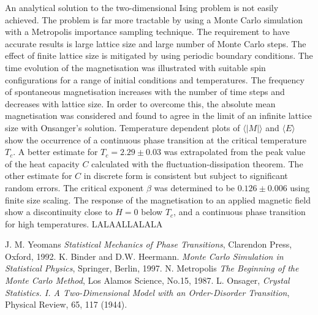 \documentclass[a4paper]{article}
\begin{document}
An analytical solution to the two-dimensional Ising problem is not easily achieved. The problem is far more tractable by using a Monte Carlo simulation with a Metropolis importance sampling technique. The requirement to have accurate results is large lattice size and large number of Monte Carlo steps. The effect of finite lattice size is mitigated by using periodic boundary conditions. The time evolution of the magnetisation was illustrated with suitable spin configurations for a range of initial conditions and temperatures. The frequency of spontaneous magnetisation increases with the number of time steps and decreases with lattice size. In order to overcome this, the absolute mean magnetisation was considered and found to agree in the limit of an infinite lattice size with Onsanger's solution. Temperature dependent plots of $\langle |M| \rangle$ and $\langle E \rangle$ show the occurrence of a continuous phase transition at the critical temperature $T_c$. A better estimate for $T_c = 2.29 \pm 0.03$ was extrapolated from the peak value of the heat capacity $C$ calculated with the fluctuation-dissipation theorem. The other estimate for $C$ in discrete form is consistent but subject to significant random errors. The critical exponent $\beta$ was determined to be $0.126 \pm 0.006$ using finite size scaling. The response of the magnetisation to an applied magnetic field show a discontinuity close to $H = 0$ below $T_c$, and a continuous phase transition for high temperatures. LALAALLALALA

\begin{thebibliography}{3}

 J. M. Yeomans \emph{Statistical Mechanics of Phase Transitions}, Clarendon Press, Oxford, 1992.
  K. Binder and D.W. Heermann. \emph{Monte Carlo Simulation in Statistical Physics}, Springer, Berlin, 1997.
  N. Metropolis \emph{The Beginning of the Monte Carlo Method}, Los Alamos Science, No.15, 1987. 
  L. Onsager, \emph{Crystal Statistics. I. A Two-Dimensional Model with an Order-Disorder Transition}, Physical Review, 65, 117 (1944).
 
\end{thebibliography}

\appendix
\end{document}
